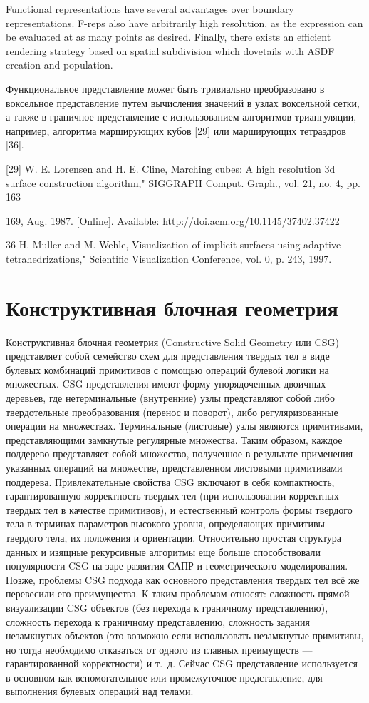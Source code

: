 {{{{{Functional representations have several advantages over boundary representations.
F-reps also have arbitrarily high resolution, as the expression can be evaluated at as many
points as desired. Finally, there exists an efficient rendering strategy based on spatial
subdivision which dovetails with ASDF creation and population.

Функциональное представление может быть тривиально преобразовано в воксельное представление путем вычисления значений в узлах воксельной сетки, а также в граничное представление с использованием алгоритмов триангуляции, например, алгоритма марширующих кубов [29] или марширующих тетраэдров [36].

[29] W. E. Lorensen and H. E. Cline, Marching cubes: A high resolution 3d surface
construction algorithm," SIGGRAPH Comput. Graph., vol. 21, no. 4, pp. 163{
169, Aug. 1987. [Online]. Available: http://doi.acm.org/10.1145/37402.37422

36 H. Muller and M. Wehle, Visualization of implicit surfaces using adaptive tetrahedrizations," Scientific Visualization Conference, vol. 0, p. 243, 1997.

\section{Конструктивная блочная геометрия} \label{sect_csg}

Конструктивная блочная геометрия (Constructive Solid Geometry или CSG) представляет собой семейство схем для представления твердых тел в виде булевых комбинаций примитивов с помощью  операций булевой логики на множествах. CSG представления имеют форму упорядоченных двоичных деревьев, где нетерминальные (внутренние) узлы представляют собой либо твердотельные преобразования (перенос и поворот), либо регуляризованные операции на множествах. Терминальные (листовые) узлы являются примитивами, представляющими замкнутые регулярные множества. Таким образом, каждое поддерево представляет собой множество, полученное в результате применения указанных операций на множестве, представленном листовыми примитивами поддерева. Привлекательные свойства CSG включают в себя компактность, гарантированную корректность твердых тел (при использовании корректных твердых тел в качестве примитивов), и естественный контроль формы твердого тела в терминах параметров высокого уровня, определяющих примитивы твердого тела, их положения и ориентации. Относительно простая структура данных и изящные рекурсивные алгоритмы еще больше способствовали популярности CSG на заре развития САПР и геометрического моделирования. Позже, проблемы CSG подхода как основного представления твердых тел всё же перевесили его преимущества. К таким проблемам относят: сложность прямой визуализации CSG объектов (без перехода к граничному представлению), сложность перехода к граничному представлению, сложность задания незамкнутых объектов (это возможно если использовать незамкнутые примитивы, но тогда необходимо отказаться от одного из главных преимуществ — гарантированной корректности) и т. д. Сейчас CSG представление используется в основном как вспомогательное или промежуточное представление, для выполнения булевых операций над телами.

}}}}}}
